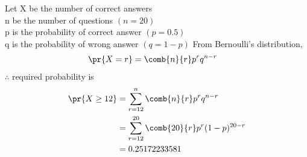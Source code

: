 Let X be the number of correct answers\\
n be the number of questions $(n=20)$\\
p is the probability of correct answer $(p=0.5)$\\
q is the probability of wrong answer $(q=1-p)$
From Bernoulli's distribution,
\begin{align}
    \pr{X=r}&=\comb{n}{r}p^rq^{n-r}
\end{align}
$\therefore$ required probability is
\begin{align}
    \pr{X\geq12}&=\sum_{r=12}^{n}\comb{n}{r} p^r q^{n-r}\\
    &=\sum_{r=12}^{20}\comb{20}{r} p^r (1-p)^{20-r}\\
    &=0.25172233581
\end{align}